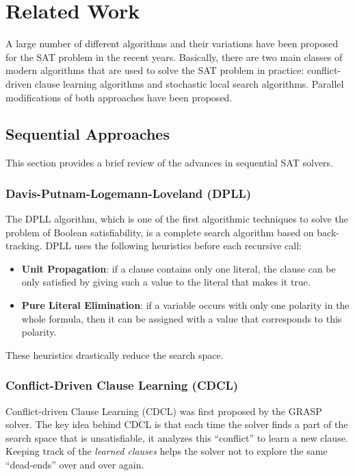 \documentclass[letterpaper, compsoc, conference]{IEEEtran}
\begin{document}
\section{Related Work}
\label{sec:related}

A large number of different algorithms and their variations have been proposed for 
the SAT problem in the recent years. Basically, there are two main classes of modern 
algorithms that are used to solve the SAT problem in practice: conflict-driven 
clause learning algorithms and stochastic local search algorithms. Parallel modifications 
of both approaches have been proposed.

\subsection{Sequential Approaches}

This section provides a brief review of the advances in sequential SAT solvers.

\subsubsection{Davis-Putnam-Logemann-Loveland (DPLL)}

The DPLL algorithm, which is one of the first algorithmic techniques to solve
the problem of Boolean satisfiability, is a complete search algorithm based on
back-tracking. DPLL uses the following heuristics before each recursive call:

\begin{itemize}
\item \textbf{Unit Propagation}: if a clause contains only one literal, the clause 
can be only satisfied by giving such a value to the literal that makes it true. 

\item \textbf{Pure Literal Elimination}: if a variable occurs with only one
polarity in the whole formula, then it can be assigned with a value that
corresponds to this polarity.
\end{itemize}
These heuristics drastically reduce the search space.

\subsubsection{Conflict-Driven Clause Learning (CDCL)}

Conflict-driven Clause Learning (CDCL) was first proposed by the
GRASP~\cite{Silva1997GRASP} solver. The key idea behind CDCL is that each time the
solver finds a part of the search space that is unsatisfiable, it analyzes this
``conflict'' to learn a new clause. Keeping track of the \emph{learned clauses}
helps the solver not to explore the same ``dead-ends'' over and over again.
\end{document}
